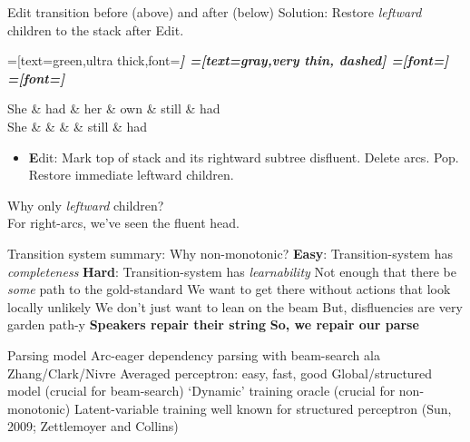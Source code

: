 \documentclass[color=usenames,dvipsnames]{lecture}
\begin{document}
\begin{plain}{Edit transition before (above) and after (below)}
Solution: Restore \emph{leftward} children to the stack after Edit.

\begin{center}
\begin{dependency}[theme=simple]
    =[text=green,ultra thick,font=\bfseries\itshape]
    =[text=gray,very thin, dashed]
    =[font=\bfseries\itshape]
    =[font=\itshape]
    \begin{deptext}[column sep=.075cm, row sep=.1ex]
    She \& had \&  her \& own \& still \& had \\
    She \&  \&   \&  \& still \& had \\
    \end{deptext}

\end{dependency}
\end{center}
\begin{itemize}
  \item \textbf{E}dit: Mark top of stack and its rightward subtree disfluent. Delete arcs. Pop. Restore immediate leftward children.
\end{itemize}

Why only \emph{leftward} children?\\
For right-arcs, we've seen the fluent head.

\end{plain}

\begin{points}{Transition system summary: Why non-monotonic?}
\p \textbf{Easy}: Transition-system has \emph{completeness}
\p \textbf{Hard}: Transition-system has \emph{learnability}
\p Not enough that there be \emph{some} path to the gold-standard
\p We want to get there without actions that look locally unlikely
\p We don't just want to lean on the beam
\p But, disfluencies are very garden path-y
\p \textbf{Speakers repair their string}
\p \textbf{So, we repair our parse}
\end{points}

\begin{points}{Parsing model}
\p Arc-eager dependency parsing with beam-search ala Zhang/Clark/Nivre
\p Averaged perceptron: easy, fast, good
\p Global/structured model (crucial for beam-search)
\p `Dynamic' training oracle (crucial for non-monotonic)
\p Latent-variable training well known for structured perceptron
  (Sun, 2009; Zettlemoyer and Collins)
\end{points}
\end{document}
